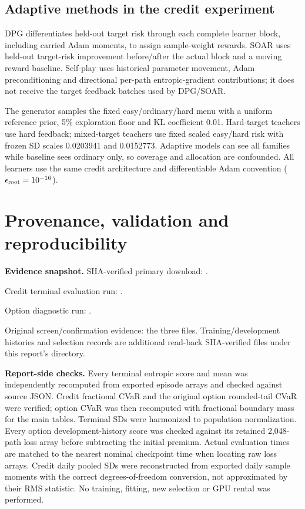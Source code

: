\documentclass[11pt,a4paper]{article}
\begin{document}
\subsection*{Adaptive methods in the credit experiment}
DPG differentiates held-out target risk through each complete learner block, including carried Adam moments, to assign sample-weight rewards. SOAR uses held-out target-risk improvement before/after the actual block and a moving reward baseline. Self-play uses historical parameter movement, Adam preconditioning and directional per-path entropic-gradient contributions; it does not receive the target feedback batches used by DPG/SOAR.

The generator samples the fixed easy/ordinary/hard menu with a uniform reference prior, 5\% exploration floor and KL coefficient 0.01. Hard-target teachers use hard feedback; mixed-target teachers use fixed scaled easy/hard risk with frozen SD scales 0.0203941 and 0.0152773. Adaptive models can see all families while baseline sees ordinary only, so coverage and allocation are confounded. All learners use the same credit architecture and differentiable Adam convention (\(\epsilon_{\rm root}=10^{-16}\)).

\clearpage
\section{Provenance, validation and reproducibility}
\textbf{Evidence snapshot.} SHA-verified primary download: .

Credit terminal evaluation run: .

Option diagnostic run: .

Original screen/confirmation evidence: the three  files. Training/development histories and selection records are additional read-back SHA-verified files under this report's  directory.

\textbf{Report-side checks.} Every terminal entropic score and mean was independently recomputed from exported episode arrays and checked against source JSON. Credit fractional CVaR and the original option rounded-tail CVaR were verified; option CVaR was then recomputed with fractional boundary mass for the main tables. Terminal SDs were harmonized to population normalization. Every option development-history score was checked against its retained 2,048-path loss array before subtracting the initial premium. Actual evaluation times are matched to the nearest nominal checkpoint time when locating raw loss arrays. Credit daily pooled SDs were reconstructed from exported daily sample moments with the correct degrees-of-freedom conversion, not approximated by their RMS statistic. No training, fitting, new selection or GPU rental was performed.
\end{document}
